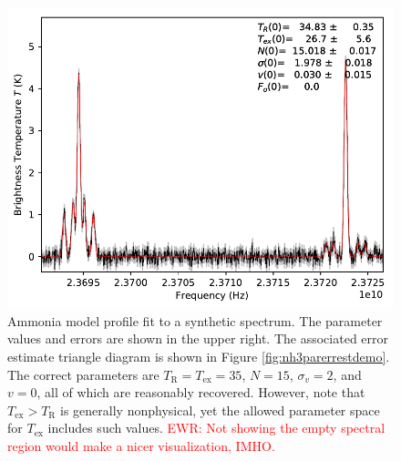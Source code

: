 \documentclass[twocolumn]{aastex62}
\begin{document}
\begin{figure}[!htp]
\includegraphics[scale=1,width=7in]{oned_ammonia_LTE_fit_example.pdf}
\caption{Ammonia model profile fit to a synthetic spectrum.
The parameter values and errors are shown in the upper right.  The associated
error estimate triangle diagram is shown in Figure \ref{fig:nh3parerrestdemo}.
The correct parameters are $T_{\mathrm{R}}=T_{\mathrm{ex}}=35$, $N=15$, $\sigma_v=2$, and $v=0$,
all of which are reasonably recovered.  However, note that $T_{\mathrm{ex}} > T_{\mathrm{R}}$
is generally nonphysical, yet the allowed parameter space for $T_{\mathrm{ex}}$ includes
such values. \textcolor{red}{EWR: Not showing the empty spectral region would make a nicer visualization, IMHO.}
}
\label{fig:nh3synthspecdemo}
\end{figure}
\end{document}
